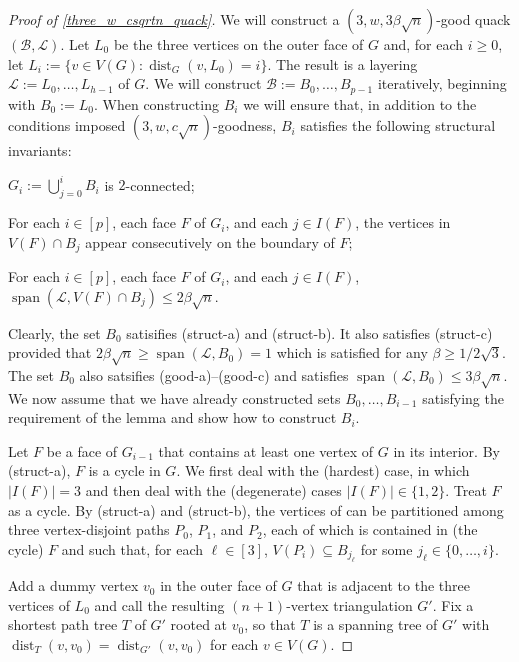 \documentclass{patmorin}
\DeclareMathOperator{\spn}{span}
\DeclareMathOperator{\dist}{dist}
\begin{document}
\begin{proof}[Proof of \cref{three_w_csqrtn_quack}]
  We will construct a  $(3,w,3\beta\sqrt{n})$-good quack $(\mathcal{B},\mathcal{L})$.
  Let $L_0$ be the three vertices on the outer face of $G$ and, for each $i\ge 0$, let $L_i:=\{v\in V(G):\dist_G(v,L_0)=i\}$. The result is a layering $\mathcal{L}:=L_0,\ldots,L_{h-1}$ of $G$. We will construct $\mathcal{B}:=B_0,\ldots,B_{p-1}$ iteratively, beginning with $B_0:=L_0$.  When constructing $B_i$ we will ensure that, in addition to the conditions imposed $(3,w,c\sqrt{n})$-goodness, $B_i$ satisfies the following structural invariants:
  \begin{compactenum}[({struct}-a)]
    \item $G_i:=\bigcup_{j=0}^i B_i$ is $2$-connected;
    \item For each $i\in[p]$, each face $F$ of $G_i$, and each $j\in I(F)$,  the vertices in $V(F)\cap B_j$ appear consecutively on the boundary of $F$;
    \item For each $i\in[p]$, each face $F$ of $G_i$, and each $j\in I(F)$, $\spn(\mathcal{L},V(F)\cap B_j)\le 2\beta\sqrt{n}$.
  \end{compactenum}

  Clearly, the set $B_0$ satisifies (struct-a) and (struct-b). It also satisfies (struct-c) provided that $2\beta\sqrt{n} \ge \spn(\mathcal{L},B_0)=1$ which is satisfied for any $\beta\ge 1/2\sqrt{3}$.  The set $B_0$ also satsifies (good-a)--(good-c) and satisfies $\spn(\mathcal{L},B_0)\le 3\beta\sqrt{n}$.  We now assume that we have already constructed sets $B_0,\ldots,B_{i-1}$ satisfying the requirement of the lemma and show how to construct $B_i$.

  Let $F$ be a face of $G_{i-1}$ that contains at least one vertex of $G$ in its interior.  By (struct-a), $F$ is a cycle in $G$.  We first deal with the (hardest) case, in which $|I(F)|=3$ and then deal with the (degenerate) cases $|I(F)|\in\{1,2\}$.  Treat $F$ as a cycle.  By (struct-a) and (struct-b), the vertices of can be partitioned among three vertex-disjoint paths $P_0$, $P_1$, and $P_2$, each of which is contained in (the cycle) $F$ and such that, for each $\ell\in[3]$,  $V(P_i)\subseteq B_{j_\ell}$ for some $j_\ell\in\{0,\ldots,i\}$.

  Add a dummy vertex $v_0$ in the outer face of $G$ that is adjacent to the three vertices of $L_0$ and call the resulting $(n+1)$-vertex triangulation $G'$.
  Fix a shortest path tree $T$ of $G'$ rooted at $v_0$, so that $T$ is a spanning tree of $G'$ with $\dist_T(v,v_0)=\dist_{G'}(v,v_0)$ for each $v\in V(G)$.


\end{proof}
\end{document}
